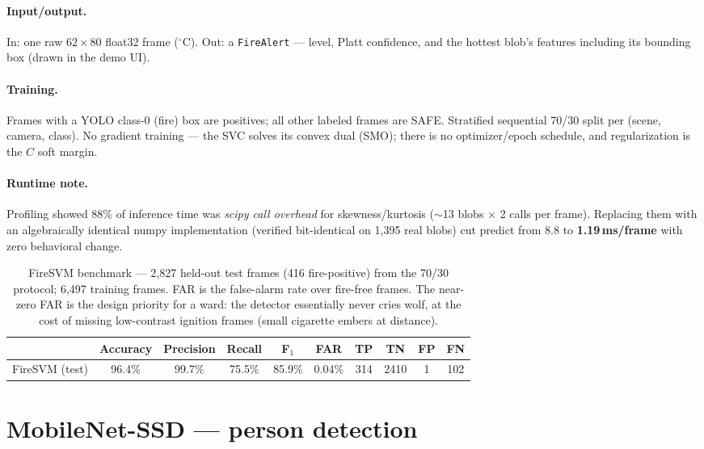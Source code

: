 \documentclass[11pt]{article}
\newcommand{\code}[1]{\texttt{\small #1}}
\newcommand{\fireacc}{96.4\%}
\newcommand{\fireprec}{99.7\%}
\newcommand{\firerec}{75.5\%}
\newcommand{\firefone}{85.9\%}
\newcommand{\firefar}{0.04\%}
\newcommand{\firetp}{314}\newcommand{\firetn}{2410}
\newcommand{\firefp}{1}\newcommand{\firefn}{102}
\newcommand{\firetrain}{6{,}497}\newcommand{\firetest}{2{,}827}
\newcommand{\firetestpos}{416}
\begin{document}
\paragraph{Input/output.} In: one raw $62\times80$ float32 frame
($^\circ$C). Out: a \code{FireAlert} --- level, Platt confidence, and the
hottest blob's features including its bounding box (drawn in the demo UI).

\paragraph{Training.} Frames with a YOLO class-0 (fire) box are positives;
all other labeled frames are SAFE. Stratified sequential 70/30 split per
(scene, camera, class). No gradient training --- the SVC solves its convex
dual (SMO); there is no optimizer/epoch schedule, and regularization is the
$C$ soft margin.

\paragraph{Runtime note.} Profiling showed 88\% of inference time was
\emph{scipy call overhead} for skewness/kurtosis ($\sim$13 blobs $\times$ 2
calls per frame). Replacing them with an algebraically identical numpy
implementation (verified bit-identical on 1{,}395 real blobs) cut predict
from 8.8 to \textbf{1.19\,ms/frame} with zero behavioral change.

\begin{table}[H]\centering\small
\begin{tabular}{lccccc|cccc}
\toprule
& Accuracy & Precision & Recall & F$_1$ & FAR & TP & TN & FP & FN\\
\midrule
FireSVM (test) & \fireacc & \fireprec & \firerec & \firefone & \firefar
& \firetp & \firetn & \firefp & \firefn\\
\bottomrule
\end{tabular}
\caption{FireSVM benchmark --- \firetest{} held-out test frames
(\firetestpos{} fire-positive) from the 70/30 protocol;
\firetrain{} training frames. FAR is the false-alarm rate over
fire-free frames. The near-zero FAR is the design priority for a ward:
the detector essentially never cries wolf, at the cost of missing
low-contrast ignition frames (small cigarette embers at distance).}
\end{table}

\section{MobileNet-SSD --- person detection}
\end{document}
